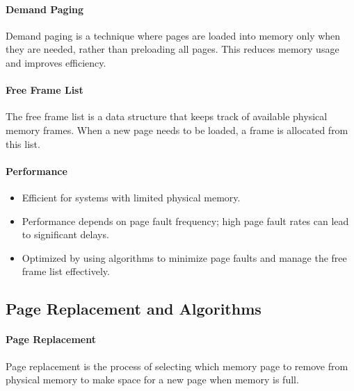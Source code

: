\documentclass{article}
\begin{document}
\paragraph{Demand Paging}
Demand paging is a technique where pages are loaded into memory only when they are needed, rather than preloading all pages. This reduces memory usage and improves efficiency.

\paragraph{Free Frame List}
The free frame list is a data structure that keeps track of available physical memory frames. When a new page needs to be loaded, a frame is allocated from this list.

\paragraph{Performance}
\begin{itemize}
    \item Efficient for systems with limited physical memory.
    \item Performance depends on page fault frequency; high page fault rates can lead to significant delays.
    \item Optimized by using algorithms to minimize page faults and manage the free frame list effectively.
\end{itemize}

\subsection{Page Replacement and Algorithms}

\paragraph{Page Replacement}
Page replacement is the process of selecting which memory page to remove from physical memory to make space for a new page when memory is full. 
\end{document}
